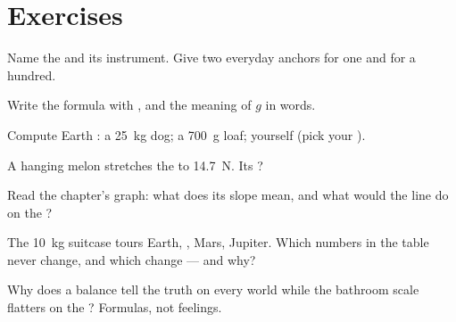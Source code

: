 \section{Exercises}

\begin{exercise}[$\star$]\label{exo:g9:weight-vs-mass:1}
Name the   and its instrument. Give two everyday
anchors for one  and for a hundred.
\end{exercise}

\begin{exercise}[$\star$]\label{exo:g9:weight-vs-mass:2}
Write the  formula with , and the meaning of $g$
in words.
\end{exercise}

\begin{exercise}[$\star$]\label{exo:g9:weight-vs-mass:3}
Compute Earth : a \qty{25}{kg} dog; a \qty{700}{g}
loaf; yourself (pick your ).
\end{exercise}

\begin{exercise}[$\star$]\label{exo:g9:weight-vs-mass:4}
A hanging melon stretches the  to \qty{14.7}{N}.
Its ?
\end{exercise}

\begin{exercise}[$\star$]\label{exo:g9:weight-vs-mass:5}
Read the chapter's graph: what does its slope mean, and what
would the line do on the ?
\end{exercise}

\begin{exercise}[$\star$]\label{exo:g9:weight-vs-mass:6}
The \qty{10}{kg} suitcase tours Earth, , Mars, Jupiter.
Which numbers in the table never change, and which change
--- and why?
\end{exercise}

\begin{exercise}[$\star$]\label{exo:g9:weight-vs-mass:7}
Why does a balance tell the truth on every world while the
bathroom scale flatters on the ? Formulas, not feelings.
\end{exercise}

